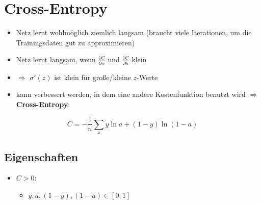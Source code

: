 \section{Cross-Entropy}

\begin{itemize}
  \item Netz lernt wohlmöglich ziemlich langsam (braucht viele Iterationen, um die Trainingsdaten gut zu approximieren)
  \item Netz lernt langsam, wenn $\frac{\partial C}{\partial w}$ und $\frac{\partial C}{\partial b}$ klein
  \item $\Rightarrow$ $\sigma'(z)$ ist klein für große/kleine $z$-Werte
  \item kann verbessert werden, in dem eine andere Kostenfunktion benutzt wird $\Rightarrow$ \textbf{Cross-Entropy}:
\end{itemize}

\begin{equation*}
  C = - \frac{1}{n} \sum_x y \ln a + (1 - y) \ln (1 - a)
\end{equation*}

\subsection{Eigenschaften}

\begin{itemize}
  \item $C > 0$:
  \begin{itemize}
    \item $y, a, (1-y), (1 - a) \in [0,1]$
  \end{itemize}
\end{itemize}
